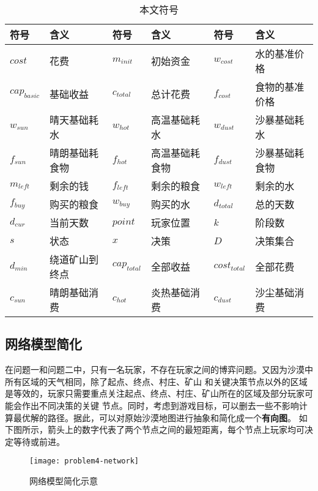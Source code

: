 \documentclass[bwprint]{cumcmthesis} %
\begin{document}
\begin{table}[!htbp]
    \caption{本文符号}\label{tab:sign} \centering
    \begin{tabular}{p{1.5cm}p{3cm}|p{1.5cm}p{3cm}|p{1.5cm}p{3cm}}
        \toprule[1.5pt]
        符号 & 含义 & 符号 & 含义 & 符号 & 含义\\
        \midrule[1pt]
        $cost$ & 花费 & $m_{init}$ & 初始资金 & $w_{cost}$ & 水的基准价格 \\
        $cap_{basic}$ & 基础收益 & $c_{total}$ & 总计花费  & $f_{cost}$ & 食物的基准价格 \\
        $w_{sun}$ & 晴天基础耗水 & $w_{hot}$ & 高温基础耗水 & $w_{dust}$ & 沙暴基础耗水 \\
        $f_{sun}$ & 晴朗基础耗食物 & $f_{hot}$ & 高温基础耗食物 & $f_{dust}$ & 沙暴基础耗食物\\ 
        $m_{left}$ & 剩余的钱 & $f_{left}$ & 剩余的粮食 & $w_{left}$ & 剩余的水 \\
        $f_{buy}$ & 购买的粮食 & $w_{buy}$ & 购买的水 & $d_{total}$ & 总的天数 \\ 
        $d_{cur}$ & 当前天数 & $point$ & 玩家位置 & $k$ & 阶段数 \\
        $s$ & 状态 & $x$ & 决策 & $D$ & 决策集合 \\ 
        $d_{min}$ & 绕道矿山到终点 & $cap_{total}$ & 全部收益  & $cost_{total}$ & 全部花费   \\
        $c_{sun}$ & 晴朗基础消费 & $c_{hot}$ & 炎热基础消费  & $c_{dust}$ & 沙尘基础消费    \\
        \bottomrule[1.5pt]
    \end{tabular}
\end{table}



\subsection{网络模型简化}
\label{subsec:shortest}

在问题一和问题二中，只有一名玩家，不存在玩家之间的博弈问题。又因为沙漠中所有区域的天气相同，除了起点、终点、村庄、矿山
和关键决策节点以外的区域是等效的，玩家只需要重点关注起点、终点、村庄、矿山所在的区域及部分玩家可能会作出不同决策的关键
节点。同时，考虑到游戏目标，可以删去一些不影响计算最优解的路径。据此，可以对原始沙漠地图进行抽象和简化成一个\textbf{有向图}。
如下图所示，箭头上的数字代表了两个节点之间的最短距离，每个节点上玩家均可决定等待或前进。

\begin{figure}[!h]
    \centering
    \texttt{[image: problem4-network]}
    \caption{网络模型简化示意}
    \label{fig:problem4-network}
\end{figure}
\end{document}
